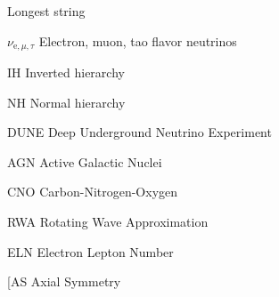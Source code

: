 
\begin{glossary}{Longest  string}
    
    \item[$\nu_{\mathrm e, \mu, \tau}$]
        Electron, muon, tao flavor neutrinos
    \item[IH]
        Inverted hierarchy
    \item[NH]
        Normal hierarchy
    \item[DUNE]
        Deep Underground Neutrino Experiment
    \item[AGN]
        Active Galactic Nuclei
    \item[CNO]
        Carbon-Nitrogen-Oxygen
    \item[RWA]
        Rotating Wave Approximation
    \item[ELN]
        Electron Lepton Number
    \item[AS
        Axial Symmetry
\end{glossary}
